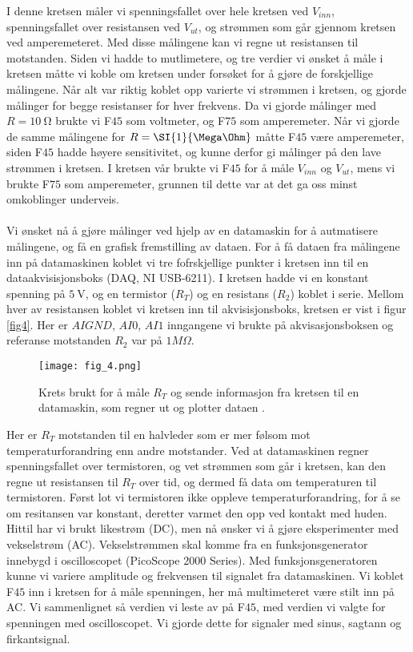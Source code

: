 \documentclass[%
 reprint,
 amsmath,amssymb,
 aps,
]{revtex4-1}
\begin{document}
I denne kretsen måler vi spenningsfallet over hele kretsen ved $V_{inn}$, spenningsfallet over resistansen ved $V_{ut}$, og strømmen som går gjennom kretsen ved amperemeteret. Med disse målingene kan vi regne ut resistansen til motstanden. Siden vi hadde to mutlimetere, og tre verdier vi ønsket å måle i kretsen måtte vi koble om kretsen under forsøket for å gjøre de forskjellige målingene. Når alt var riktig koblet opp varierte vi strømmen i kretsen, og gjorde målinger for begge resistanser for hver frekvens. Da vi gjorde målinger med $R=\SI{10}{\ohm}$ brukte vi F$45$ som voltmeter, og F$75$ som amperemeter. Når vi gjorde de samme målingene for $R=\SI{1}{\Mega \Ohm}$ måtte F$45$ være amperemeter, siden F$45$ hadde høyere sensitivitet, og kunne derfor gi målinger på den lave strømmen i kretsen. I kretsen vår brukte vi F$45$ for å måle $V_{inn}$ og $V_{ut}$, mens vi brukte F$75$ som amperemeter, grunnen til dette var at det ga oss minst omkoblinger underveis. \\ \\
Vi ønsket nå å gjøre målinger ved hjelp av en datamaskin for å autmatisere målingene, og få en grafisk fremstilling av dataen. For å få dataen fra målingene inn på datamaskinen koblet vi tre fofrskjellige punkter i kretsen inn til en dataakvisisjonsboks (DAQ, NI USB-6211). I kretsen hadde vi en konstant spenning på $\SI{5}{\volt}$, og en termistor ($R_T$) og en resistans ($R_2$) koblet i serie. Mellom hver av resistansen koblet vi kretsen inn til akvisisjonsboks, kretsen er vist i figur \vref{fig4}. Her er $AIGND$, $AI0$, $AI1$ inngangene vi brukte på akvisasjonsboksen og referanse motstanden $R_2$ var på $1M\Omega$.
\begin{figure}[h!]
    \centering
    \texttt{[image: fig\_4.png]}
    \caption{Krets brukt for å måle $R_T$ og sende informasjon fra kretsen til en datamaskin, som regner ut og plotter dataen \cite{oppgave}.}
    \label{fig4}
\end{figure}
Her er $R_T$ motstanden til en halvleder som er mer følsom mot temperaturforandring enn andre motstander. Ved at datamaskinen regner spenningsfallet over termistoren, og vet strømmen som går i kretsen, kan den regne ut resistansen til $R_T$ over tid, og dermed få data om temperaturen til termistoren. Først lot vi termistoren ikke oppleve temperaturforandring, for å se om resitansen var konstant, deretter varmet den opp ved kontakt med huden. \\
Hittil har vi brukt likestrøm (DC), men nå ønsker vi å gjøre eksperimenter med vekselstrøm (AC). Vekselstrømmen skal komme fra en funksjonsgenerator innebygd i oscilloscopet (PicoScope 2000 Series). Med funksjonsgeneratoren kunne vi variere amplitude og frekvensen til signalet fra datamaskinen. Vi koblet F$45$ inn i kretsen for å måle spenningen, her må multimeteret være stilt inn på AC. Vi sammenlignet så verdien vi leste av på F$45$, med verdien vi valgte for spenningen med oscilloscopet. Vi gjorde dette for signaler med sinus, sagtann og firkantsignal. \\
\end{document}
